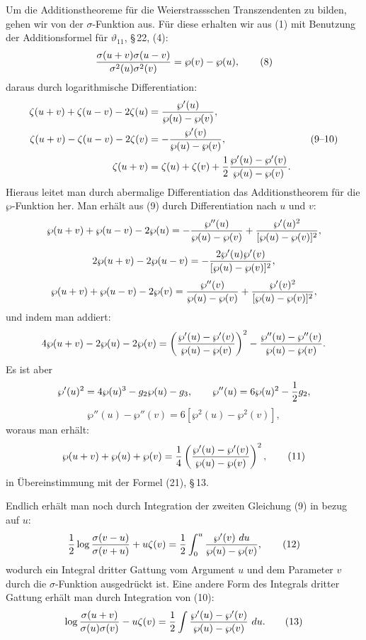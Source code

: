 \documentclass[11pt]{article}
\providecommand{\dd}{\,d}
\begin{document}
Um die Additionstheoreme für die Weierstrassschen Transzendenten zu bilden, gehen wir von der $\sigma$-Funktion aus. Für diese erhalten wir aus (1) mit Benutzung der Additionsformel für $\vartheta_{11}$, \S\,22, (4):
\begin{equation}
{\sigma(u+v)\sigma(u-v)\over\sigma^2(u)\sigma^2(v)}=\wp(v)-\wp(u),
\tag{8}
\end{equation}
daraus durch logarithmische Differentiation:
\begin{equation}
\begin{aligned}
\zeta(u+v)+\zeta(u-v)-2\zeta(u)&={\wp'(u)\over\wp(u)-\wp(v)},\\
\zeta(u+v)-\zeta(u-v)-2\zeta(v)&=-{\wp'(v)\over\wp(u)-\wp(v)},\\
\zeta(u+v)&=\zeta(u)+\zeta(v)+{1\over2}{\wp'(u)-\wp'(v)\over\wp(u)-\wp(v)}.
\end{aligned}
\tag{9--10}
\end{equation}
Hieraus leitet man durch abermalige Differentiation das Additionstheorem für die $\wp$-Funktion her. Man erhält aus (9) durch Differentiation nach $u$ und $v$:
\[
\wp(u+v)+\wp(u-v)-2\wp(u)=-{\wp''(u)\over\wp(u)-\wp(v)}+{\wp'(u)^2\over[\wp(u)-\wp(v)]^2},
\]
\[
2\wp(u+v)-2\wp(u-v)=-{2\wp'(u)\wp'(v)\over[\wp(u)-\wp(v)]^2},
\]
\[
\wp(u+v)+\wp(u-v)-2\wp(v)={\wp''(v)\over\wp(u)-\wp(v)}+{\wp'(v)^2\over[\wp(u)-\wp(v)]^2},
\]
und indem man addiert:
\[
4\wp(u+v)-2\wp(u)-2\wp(v)
=\left({\wp'(u)-\wp'(v)\over\wp(u)-\wp(v)}\right)^2
-{\wp''(u)-\wp''(v)\over\wp(u)-\wp(v)}.
\]
Es ist aber
\[
\wp'(u)^2=4\wp(u)^3-g_2\wp(u)-g_3,
\qquad
\wp''(u)=6\wp(u)^2-{1\over2}g_2,
\]
\[
\wp''(u)-\wp''(v)=6[\wp^2(u)-\wp^2(v)],
\]
woraus man erhält:
\begin{equation}
\wp(u+v)+\wp(u)+\wp(v)=
{1\over4}\left({\wp'(u)-\wp'(v)\over\wp(u)-\wp(v)}\right)^2,
\tag{11}
\end{equation}
in Übereinstimmung mit der Formel (21), \S\,13.

Endlich erhält man noch durch Integration der zweiten Gleichung (9) in bezug auf $u$:
\begin{equation}
{1\over2}\log{\sigma(v-u)\over\sigma(v+u)}+u\zeta(v)
={1\over2}\int_0^u{\wp'(v)\,\dd u\over\wp(u)-\wp(v)},
\tag{12}
\end{equation}
wodurch ein Integral dritter Gattung vom Argument $u$ und dem Parameter $v$ durch die $\sigma$-Funktion ausgedrückt ist. Eine andere Form des Integrals dritter Gattung erhält man durch Integration von (10):
\begin{equation}
\log{\sigma(u+v)\over\sigma(u)\sigma(v)}-u\zeta(v)
={1\over2}\int {\wp'(u)-\wp'(v)\over\wp(u)-\wp(v)}\,\dd u.
\tag{13}
\end{equation}
\end{document}

